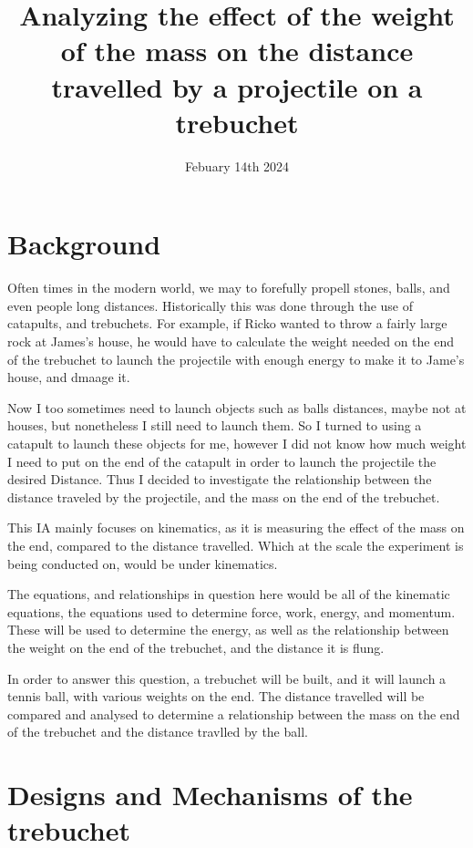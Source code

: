 \documentclass[12pt]{article}
\title{Analyzing the effect of the weight of the mass on the distance travelled by a projectile on a trebuchet}
\author{}
\date{Febuary 14th 2024}
\begin{document}
\maketitle

\pagebreak
\tableofcontents

\pagebreak
\section{Background}
Often times in the modern world, we may to forefully propell stones, balls, and even people long distances. Historically this was done through the use of catapults, and trebuchets. For example, if Ricko wanted to throw a fairly large rock at James's house, he would have to calculate the weight needed on the end of the trebuchet to launch the projectile with enough energy to make it to Jame's house, and dmaage it.

Now I too sometimes need to launch objects such as balls distances, maybe not at houses, but nonetheless I still need to launch them. So I turned to using a catapult to launch these objects for me, however I did not know how much weight I need to put on the end of the catapult in order to launch the projectile the desired Distance. Thus I decided to investigate the relationship between the distance traveled by the projectile, and the mass on the end of the trebuchet.

This IA mainly focuses on kinematics, as it is measuring the effect of the mass on the end, compared to the distance travelled. Which at the scale the  experiment is being conducted on, would be under kinematics.

The equations, and relationships in question here would be all of the kinematic equations, the equations used to determine force, work, energy, and momentum. These will be used to determine the energy, as well as the relationship between the weight on the end of the trebuchet, and the distance it is flung.

In order to answer this question, a trebuchet will be built, and it will launch a tennis ball, with various weights on the end. The distance travelled will be compared and analysed to determine a relationship between the mass on the end of the trebuchet and the distance travlled by the ball.


\section{Designs and Mechanisms of the trebuchet}
\end{document}
